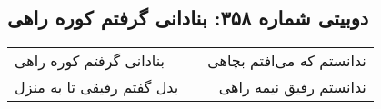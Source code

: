 \begin{center}
\section*{دوبیتی شماره ۳۵۸: بنادانی گرفتم کوره راهی}
\label{sec:358}
\begin{longtable}{l p{0.5cm} r}
بنادانی گرفتم کوره راهی
&&
ندانستم که می‌افتم بچاهی
\\
بدل گفتم رفیقی تا به منزل
&&
ندانستم رفیق نیمه راهی
\\
\end{longtable}
\end{center}
